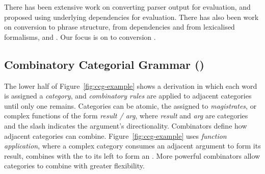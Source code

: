 There has been extensive work on converting parser output for evaluation, \myeg
\textcite{Lin:1998} and \textcite{Briscoe-Carroll-Graham-Copestake:2002} proposed
using underlying dependencies for evaluation.  There has also been work on
conversion to phrase structure, from dependencies \parencite{Xia:2001,Xia:2009} and
from lexicalised formalisms, \myeg \hpsg \parencite{Matsuzaki-Tsujii:2008} and \mytag
\parencite{Chiang:2000,Sarkar:2001}. Our focus is on \ccg to \ptb conversion
\parencite{Clark-Curran:2009}.

\subsection{Combinatory Categorial Grammar (\ccg)}

The lower half of Figure~\ref{fig:ccg-example} shows a \ccg derivation
\parencite{Steedman:2000} in which each word is assigned a {\em category}, and
{\em combinatory rules} are applied to adjacent categories until only one
remains.  Categories can be atomic, \myeg the  assigned to
\textit{magistrates}, or complex functions of the form {\em result / arg}, where
{\em result} and {\em arg} are categories and the slash indicates the argument's
directionality.  Combinators define how adjacent categories can combine.
Figure~\ref{fig:ccg-example} uses {\em function application}, where a complex
category consumes an adjacent argument to form its result, \myeg {} combines with the  to its left to form an .  More
powerful combinators allow categories to combine with greater flexibility.

